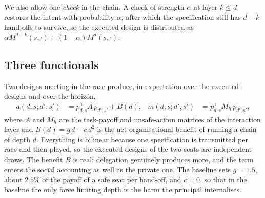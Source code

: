 \documentclass[11pt,a4paper]{article}
\theoremstyle{definition}
\begin{document}
We also allow one \emph{check} in the chain. A check of strength $\alpha$ at
layer $k\le d$ restores the intent with probability $\alpha$, after which the
specification still has $d-k$ hand-offs to survive, so the executed design is
distributed as $\alpha M^{d-k}(s,\cdot) + (1-\alpha)M^{d}(s,\cdot)$.

\subsection{Three functionals}

Two designs meeting in the race produce, in expectation over the executed
designs and over the horizon,
\begin{align}
  a(d,s;d',s') &= p_{d,s}^{\top} A\, p_{d',s'} + B(d), &
  m(d,s;d',s') &= p_{d,s}^{\top} M_{h}\, p_{d',s'},
  \label{eq:bilinear}
\end{align}
where $A$ and $M_{h}$ are the task-payoff and unsafe-action matrices of the
interaction layer and $B(d)=g\,d-c\,d^{2}$ is the net organisational benefit of
running a chain of depth $d$. Everything is bilinear because one specification
is transmitted per race and then played, so the executed designs of the two
seats are independent draws. The benefit $B$ is real: delegation genuinely
produces more, and the term enters the social accounting as well as the private
one. The baseline sets $g=1.5$, about $2.5\%$ of the payoff of a safe seat per
hand-off, and $c=0$, so that in the baseline the only force limiting depth is
the harm the principal internalises.
\end{document}

